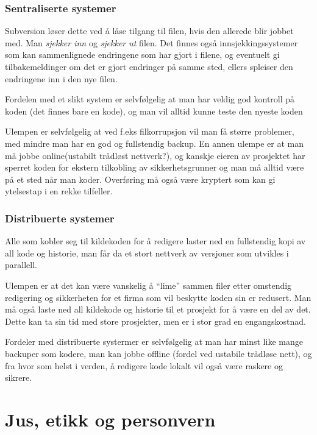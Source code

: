 \documentclass[11pt]{article}
\begin{document}
\subsubsection{Sentraliserte systemer}
\label{sec-16.2.1}

    Subversion løser dette ved å låse tilgang til filen, hvis den allerede blir jobbet med. 
    Man \emph{sjekker inn} og \emph{sjekker ut} filen.
    Det finnes også innsjekkingssystemer som kan sammenlignede endringene som har gjort i filene, 
    og eventuelt gi tilbakemeldinger om det er gjort endringer på samme sted, ellers 
    spleiser den endringene inn i den nye filen.
    
    Fordelen med et slikt system er selvfølgelig at man har veldig god kontroll på koden
    (det finnes bare en kode), og man vil alltid kunne teste den nyeste koden
    
    Ulempen er selvfølgelig at ved f.eks filkorrupsjon vil man få større problemer, med mindre 
    man har en god og fullstendig backup. En annen ulempe er at man må jobbe online(ustabilt 
    trådløst nettverk?), og kanskje eieren av prosjektet har sperret koden for ekstern 
    tilkobling av sikkerhetsgrunner og man må alltid være på et sted når man koder. Overføring
    må også være kryptert som kan gi ytelsestap i en rekke tilfeller.
    
\subsubsection{Distribuerte systemer}
\label{sec-16.2.2}

    Alle som kobler seg til kildekoden for å redigere laster ned en fullstendig kopi
    av all kode og historie, man får da et stort nettverk av versjoner som utvikles i
    parallell.

    Ulempen er at det kan være vanskelig å ``lime'' sammen filer etter omstendig redigering
    og sikkerheten for et firma som vil beskytte koden sin er redusert. Man må også laste
    ned all kildekode og historie til et prosjekt for å være en del av det. Dette kan ta sin
    tid med store prosjekter, men er i stor grad en engangskostnad.

    Fordeler med distribuerte systermer er selvfølgelig at man har minst like mange backuper
    som kodere, man kan jobbe offline (fordel ved ustabile trådløse nett), og fra hvor som helst
    i verden, å redigere kode lokalt vil også være raskere og sikrere.
\section{Jus, etikk og personvern}
\label{sec-17}
\end{document}
